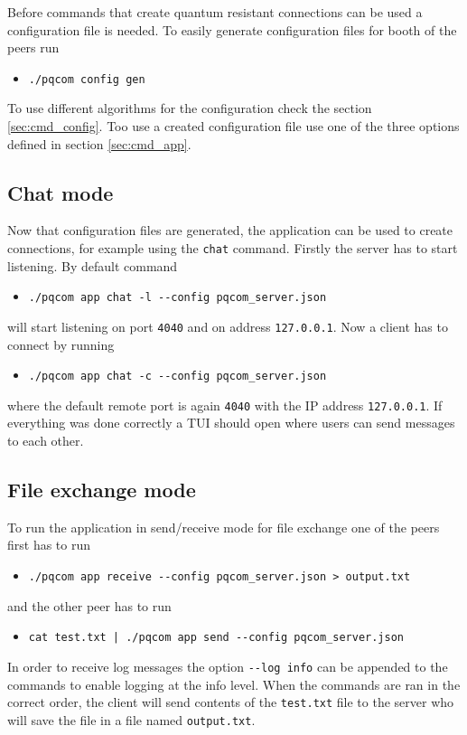 Before commands that create quantum resistant connections can be used a configuration file is needed. To easily generate configuration files for booth of the peers run
\begin{itemize}
  \item \texttt{./pqcom config gen}
\end{itemize}
To use different algorithms for the configuration check the section \ref{sec:cmd_config}. Too use a created configuration file use one of the three options defined in section \ref{sec:cmd_app}.

\subsection{Chat mode}
Now that configuration files are generated, the application can be used to create connections, for example using the \texttt{chat} command. Firstly the server has to start listening. By default command
\begin{itemize}
  \item \texttt{./pqcom app chat -l -\--config pqcom\_server.json}
\end{itemize}
will start listening on port \texttt{4040} and on address \texttt{127.0.0.1}. Now a client has to connect by running
\begin{itemize}
  \item \texttt{./pqcom app chat -c -\--config pqcom\_server.json}
\end{itemize}
where the default remote port is again \texttt{4040} with the IP address \texttt{127.0.0.1}. If everything was done correctly a TUI should open where users can send messages to each other.

\subsection{File exchange mode}
To run the application in send/receive mode for file exchange one of the peers first has to run
\begin{itemize}
  \item \texttt{./pqcom app receive -\--config pqcom\_server.json > output.txt}
\end{itemize}
and the other peer has to run
\begin{itemize}
  \item \texttt{cat test.txt | ./pqcom app send -\--config pqcom\_server.json}
\end{itemize}
In order to receive log messages the option \texttt{-\--log info} can be appended to the commands to enable logging at the info level. When the commands are ran in the correct order, the client will send contents of the \texttt{test.txt} file to the server who will save the file in a file named \texttt{output.txt}.

